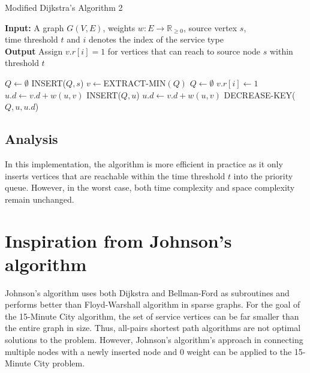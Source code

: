 \begin{algorithm}[H]
    \caption{Modified Dijkstra's Algorithm 2} \label{alg:modified_dijsktra2}
    \textbf{Input:} A graph $G(V,E)$, weights $w:E\rightarrow\mathbb{R}_{\geq 0}$, source vertex $s$, \\  time threshold $t$ and $i$ denotes the index of the service type\\
    \textbf{Output} Assign $v.r[i]=1$ for vertices that can reach to source node $s$ within threshold $t$ %
    \begin{algorithmic}
        \State $Q\gets\emptyset$ 
        \State INSERT($Q,s$)
            \State $v\gets$EXTRACT-MIN$(Q)$
                \State $Q\gets\emptyset$ 
            \Else
                \State $v.r[i] \gets 1$
                        \State $u.d\gets v.d+w(u,v)$ %
                        \State INSERT($Q,u$)
                        \State $u.d\gets v.d+w(u,v)$
                        \State DECREASE-KEY($Q,u,u.d$)
                    \EndIf
                \EndFor
            \EndIf
        \EndWhile
    \end{algorithmic}
\end{algorithm}

\subsection{Analysis}

In this implementation, the algorithm is more efficient in practice as it only inserts vertices that are reachable within the time threshold $t$ into the priority queue. However, in the worst case, both time complexity and space complexity remain unchanged.

\section{Inspiration from Johnson's algorithm}

Johnson's algorithm uses both Dijkstra and Bellman-Ford as subroutines and performs better than Floyd-Warshall algorithm in sparse graphs. For the goal of the 15-Minute City algorithm, the set of service vertices can be far smaller than the entire graph in size. Thus, all-pairs shortest path algorithms are not optimal solutions to the problem. However, Johnson's algorithm's approach in connecting multiple nodes with a newly inserted node and $0$ weight can be applied to the 15-Minute City problem.


